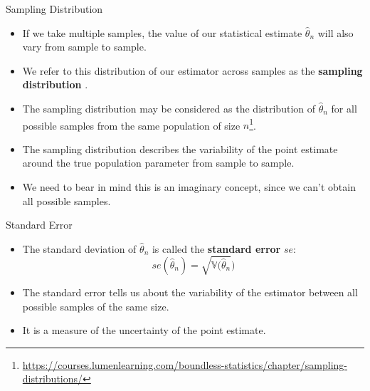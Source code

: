 \documentclass[handout]{beamer}
\begin{document}
\begin{frame}{Sampling Distribution}

\scriptsize{

\begin{itemize}
\item If we take multiple samples, the value of our statistical estimate $\hat{\theta}_n$ will also vary from sample to sample.

\item We refer to this distribution of our estimator across samples as the   \textbf{sampling distribution} \cite{poldrack2019statistical}.

\item The sampling distribution may be considered as the distribution of  $\hat{\theta}_n$ for all possible samples from the same population of size $n$\footnote{\url{https://courses.lumenlearning.com/boundless-statistics/chapter/sampling-distributions/}}.

\item The sampling distribution describes the variability of the point estimate around the true population parameter from sample to sample. 

\item We need to bear in mind this is an imaginary concept, since we can't obtain all possible samples.


\end{itemize}

} 
\end{frame}


\begin{frame}{Standard Error}

\scriptsize{

\begin{itemize}
\item The standard deviation of $\hat{\theta}_n$ is called the \textbf{standard error} $se$:
\begin{displaymath}
se(\hat{\theta}_n)=\sqrt{\mathbb{V}(\hat{\theta}_n})
\end{displaymath}
\item The standard error tells us about the variability of the estimator between all possible samples of the same size.
\item It is a measure of the uncertainty of the point estimate.
\end{itemize}

} 
\end{frame}
\end{document}
